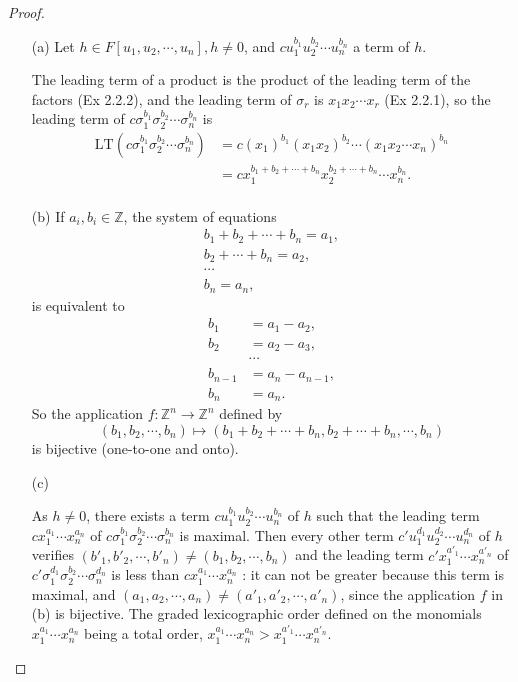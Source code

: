 \documentclass[11pt,a4paper]{article}
\begin{document}
\begin{proof}
\begin{enumerate}
\item[(a)]
Let $h \in F[u_1,u_2,\cdots,u_n],h\neq 0$, and $cu_1^{b_1}u_2^{b_2}\cdots u_n^{b_n}$ a term of $h$.

The leading term of a product is the product of the leading term of the factors (Ex 2.2.2), and the leading term of $\sigma_r$ is $x_1x_2\cdots x_r$ (Ex 2.2.1),  so the leading term of $c\sigma_1^{b_1}\sigma_2^{b_2}\cdots \sigma_n^{b_n}$ is
\begin{align*}
{\mathrm  {LT}}(c\sigma_1^{b_1}\sigma_2^{b_2}\cdots \sigma_n^{b_n})&=c(x_1)^{b_1}(x_1x_2)^{b_2}\cdots(x_1x_2\cdots x_n)^{b_n}\\
&=c x_1^{b_1+b_2+\cdots+b_n} x_2^{b_2+\cdots+ b_n} \cdots x_n^{b_n}.\\
\end{align*}

\item[(b)]
If $a_i,b_i \in \mathbb{Z}$, the system of equations
\begin{align*}
 b_1+b_2+\cdots+b_n=a_1,\\
b_2+\cdots + b_n=a_2,\\
\cdots\\
b_n=a_n,
\end{align*}
is equivalent to
\begin{align*}
b_1 &=a_1-a_2,\\
b_2&=a_2-a_3,\\
&\cdots\\
b_{n-1} &= a_{n}-a_{n-1},\\
b_n &= a_n.
\end{align*}
So the application $f : \mathbb{Z}^n \to \mathbb{Z}^n$ defined by $$(b_1,b_2,\cdots,b_n)\mapsto (b_1+b_2+\cdots+b_n, b_2+\cdots+b_n, \cdots,b_n)$$ is bijective (one-to-one and onto).

\item[(c)]

As $h\neq 0$, there exists a term  $cu_1^{b_1}u_2^{b_2}\cdots u_n^{b_n}$ of $h$ such that the leading term $cx_1^{a_1}\cdots x_n^{a_n}$ of  $c\sigma_1^{b_1}\sigma_2^{b_2}\cdots \sigma_n^{b_n}$ is maximal. Then every other term $c'u_1^{d_1}u_2^{d_2}\cdots u_n^{d_n}$ of $h$  verifies $(b'_1,b'_2,\cdots,b'_n) \neq (b_1,b_2,\cdots,b_n)$ and the leading term  $c'x_1^{a'_1}\cdots x_n^{a'_n}$ of $c'\sigma_1^{d_1}\sigma_2^{b_2}\cdots \sigma_n^{d_n}$ is less than $cx_1^{a_1}\cdots x_n^{a_n}$ : it can not be greater because this term is maximal, and $(a_1,a_2,\cdots,a_n) \neq (a'_1,a'_2,\cdots,a'_n)$, since the application $f$ in (b) is bijective. The graded lexicographic order defined on the monomials $x_1^{a_1}\cdots x_n^{a_n}$ being a total order, $x_1^{a_1}\cdots x_n^{a_n} > x_1^{a'_1}\cdots x_n^{a'_n}$.


\end{enumerate}
\end{proof}
\end{document}

